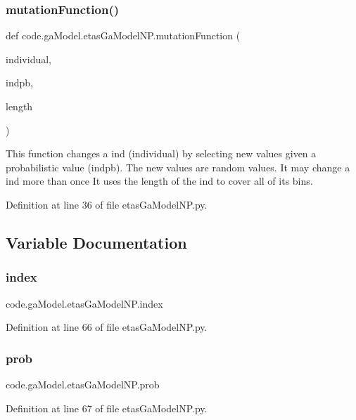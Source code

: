 \subsubsection{\texorpdfstring{mutation\+Function()}{mutationFunction()}}
{\footnotesize\ttfamily def code.\+ga\+Model.\+etas\+Ga\+Model\+N\+P.\+mutation\+Function (\begin{DoxyParamCaption}\item[{}]{individual,  }\item[{}]{indpb,  }\item[{}]{length }\end{DoxyParamCaption})}

\begin{DoxyVerb}This function changes a ind (individual) by selecting new values given a probabilistic value (indpb).
The new values are random values. It may change a ind more than once
It uses the length of the ind to cover all of its bins.
\end{DoxyVerb}
 

Definition at line 36 of file etas\+Ga\+Model\+N\+P.\+py.



\subsection{Variable Documentation}
\mbox{\label{namespacecode_1_1ga_model_1_1etas_ga_model_n_p_a225f0565f9551cdcb54367b68b43f0a9}} 
\subsubsection{\texorpdfstring{index}{index}}
{\footnotesize\ttfamily code.\+ga\+Model.\+etas\+Ga\+Model\+N\+P.\+index}



Definition at line 66 of file etas\+Ga\+Model\+N\+P.\+py.

\mbox{\label{namespacecode_1_1ga_model_1_1etas_ga_model_n_p_ab1c9e9d1bd611153aa796cef8982c6f6}} 
\subsubsection{\texorpdfstring{prob}{prob}}
{\footnotesize\ttfamily code.\+ga\+Model.\+etas\+Ga\+Model\+N\+P.\+prob}



Definition at line 67 of file etas\+Ga\+Model\+N\+P.\+py.

